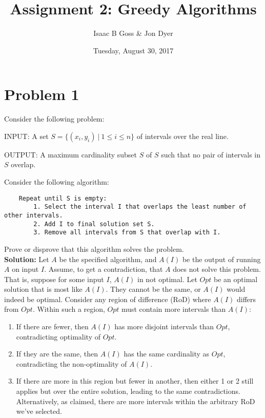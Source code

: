 \documentclass{article}
\author{Isaac B Goss \& Jon Dyer}
\title{Assignment 2: Greedy Algorithms}
\date{Tuesday, August 30, 2017}
\providecommand{\soln}{\textbf{Solution: }}
\begin{document}
\maketitle

    \section*{Problem 1}
    Consider the following problem:
    
    INPUT: A set $S = \{(x_i, y_i)\ |\ 1 \leq i \leq n\}$ of intervals over the real line.
    
    OUTPUT: A maximum cardinality subset $S$ of $S$ such that no pair of intervals in $S$ overlap.
        
    Consider the following algorithm:
    
    \begin{lstlisting}
    Repeat until S is empty:
        1. Select the interval I that overlaps the least number of other intervals.
        2. Add I to final solution set S.
        3. Remove all intervals from S that overlap with I.
    \end{lstlisting}

    Prove or disprove that this algorithm solves the problem.\\
    
    \soln Let $A$ be the specified algorithm, and $A(I)$ be the output of running $A$ on input $I$.
    Assume, to get a contradiction, that $A$ does not solve this problem.
    That is, suppose for some input $I$, $A(I)$ in not optimal.
    Let $Opt$ be an optimal solution that is most like $A(I)$.
    They cannot be the same, or $A(I)$ would indeed be optimal.
    Consider any region of difference (RoD) where $A(I)$ differs from $Opt$.
    Within such a region, $Opt$ must contain more intervals than $A(I)$:
    
    \begin{enumerate}
        \item If there are fewer, then $A(I)$ has more disjoint intervals than $Opt$, contradicting optimality of $Opt$.
        \item If they are the same, then $A(I)$ has the same cardinality as $Opt$, contradicting the non-optimality of $A(I)$.
        \item If there are more in this region but fewer in another, then either 1 or 2 still applies but over the entire solution, leading to the same contradictions. Alternatively, as claimed, there are more intervals within the arbitrary RoD we've selected.
    \end{enumerate}
    
\end{document}
